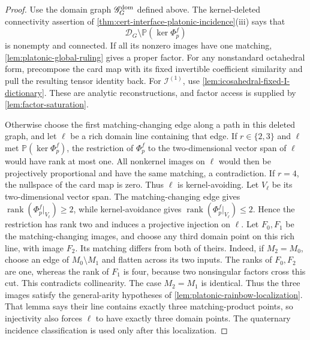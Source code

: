 \documentclass[11pt,letterpaper,onecolumn]{article}
\theoremstyle{plain}
\theoremstyle{definition}
\theoremstyle{remark}
\newcommand{\IcoOne}{{\mathcal I^{(1)}}}
\newcommand{\rank}{\operatorname{rank}}
\begin{document}
\begin{proof}
Use the domain graph \(\mathscr G_G^{\rm dom}\) defined above.  The kernel-deleted
connectivity assertion of
\cref{thm:cert-interface-platonic-incidence}\textnormal{(iii)}
says
that
\[
 \mathcal D_G\setminus\mathbb P(\ker\Phi_p^f)
\]
is nonempty and connected.  If all its nonzero images have one matching,
\cref{lem:platonic-global-ruling} gives a proper factor.  For any
nonstandard octahedral form, precompose the card map with its fixed
invertible coefficient similarity and pull the resulting tensor identity
back.  For \(\IcoOne\), use
\cref{lem:icosahedral-fixed-I-dictionary}.  These are analytic
reconstructions, and factor access is supplied by
\cref{lem:factor-saturation}.

Otherwise choose the first matching-changing edge along a path in this
deleted graph, and let \(\ell\) be a rich domain line containing that edge.  If
\(r\in\{2,3\}\) and \(\ell\) met
\(\mathbb P(\ker\Phi_p^f)\), the restriction of \(\Phi_p^f\) to the
two-dimensional vector span of \(\ell\) would have rank at most one.
All nonkernel images on \(\ell\) would then be projectively proportional
and have the same matching, a contradiction.  If \(r=4\), the nullspace of the card map is
zero.  Thus \(\ell\) is kernel-avoiding.  Let \(V_\ell\) be its
two-dimensional vector span.  The matching-changing edge gives
\(\rank(\Phi_p^f|_{V_\ell})\ge2\), while kernel-avoidance gives
\(\rank(\Phi_p^f|_{V_\ell})\le2\). Hence the restriction has rank two and
induces a projective injection on \(\ell\).  Let \(F_0,F_1\) be the
matching-changing images, and choose any third domain point on this rich
line, with image \(F_2\).  Its matching differs from both of theirs.
Indeed, if \(M_2=M_0\), choose an edge of \(M_0\setminus M_1\) and
flatten across its two inputs.  The ranks of \(F_0,F_2\) are one, whereas
the rank of \(F_1\) is four, because two nonsingular factors cross this
cut.  This contradicts collinearity. The case \(M_2=M_1\) is identical.
Thus the three images satisfy the general-arity hypotheses of
\cref{lem:platonic-rainbow-localization}.  That lemma says their line
contains exactly three matching-product points, so injectivity also forces
\(\ell\) to have exactly three domain points.  The quaternary incidence
classification is used only after this localization.


\end{proof}
\end{document}
